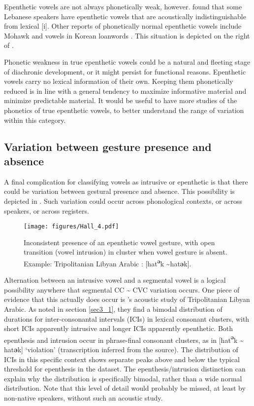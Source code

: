 \documentclass[output=paper,colorlinks,citecolor=brown]{langscibook}
\begin{document}
Epenthetic vowels are not always phonetically weak, however. \citet{hall2013acoustic} found that some Lebanese speakers have epenthetic vowels that are acoustically indistinguishable from lexical [i]. Other reports of phonetically normal epenthetic vowels include Mohawk \citep[40]{michelson1989invisibility} and vowels in Korean loanwords \citep{kim2011phonology}. This situation is depicted on the right of .

Phonetic weakness in true epenthetic vowels could be a natural and fleeting stage of diachronic development, or it might persist for functional reasons. Epenthetic vowels carry no lexical information of their own. Keeping them phonetically reduced is in line with a general tendency to maximize informative material and minimize predictable material. It would be useful to have more studies of the phonetics of true epenthetic vowels, to better understand the range of variation within this category. 

\subsection{Variation between gesture presence and absence}\label{sec4_3}

A final complication for classifying vowels as intrusive or epenthetic is that there could be variation between gestural presence and absence. This possibility is depicted in . Such variation could occur across phonological contexts, or across speakers, or across registers. 


\begin{figure}
\caption{Inconsistent presence of an epenthetic vowel gesture, with open transition (vowel intrusion) in cluster when vowel gesture is absent. Example: Tripolitanian Libyan Arabic \citep{heselwood2015epenthetic}: [hat\textbf{\textsuperscript{ə}}k \sim hat\textbf{ə}k].}
\texttt{[image: figures/Hall\_4.pdf]}
\label{fig4}
\end{figure}

Alternation between an intrusive vowel and a segmental vowel is a logical possibility anywhere that segmental CC {\textasciitilde} CVC variation occurs. One piece of evidence that this actually does occur is \citet{heselwood2015epenthetic}’s acoustic study of Tripolitanian Libyan Arabic. As noted in section \ref{sec3_1}, they find a bimodal distribution of durations for inter-consonantal intervals (ICIs) in lexical consonant clusters, with short ICIs apparently intrusive and longer ICIs apparently epenthetic. Both epenthesis and intrusion occur in phrase\hyp final consonant clusters, as in [hat\textbf{\textsuperscript{ə}}k {\textasciitilde} hat\textbf{ə}k] ‘violation’ (transcription inferred from the source). The distribution of ICIs in this specific context shows separate peaks above and below the typical threshold for epenthesis in the dataset. The epenthesis\slash intrusion distinction can explain why the distribution is specifically bimodal, rather than a wide normal distribution. Note that this level of detail would probably be missed, at least by non-native speakers, without such an acoustic study. 
\end{document}
